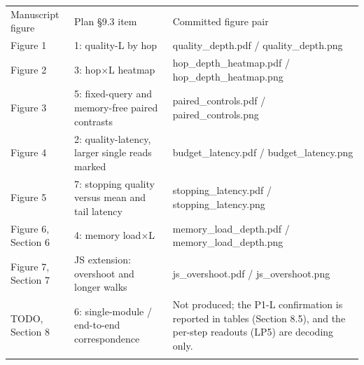 {\small
\setlength{\tabcolsep}{3pt}
\begin{longtable}{W{133}{6}W{350}{6}W{517}{6}}
\toprule
Manuscript figure & Plan \S{}9.3 item & Committed figure pair \\ \addlinespace[3pt]
\midrule \endhead
Figure 1 & 1: quality-L by hop & quality\_depth.pdf /\allowbreak{} quality\_depth.png \\ \addlinespace[3pt]
Figure 2 & 3: hop\ensuremath{\times}L heatmap & hop\_depth\_heatmap.pdf /\allowbreak{} hop\_depth\_heatmap.png \\ \addlinespace[3pt]
Figure 3 & 5: fixed-query and memory-free paired contrasts & paired\_controls.pdf /\allowbreak{} paired\_controls.png \\ \addlinespace[3pt]
Figure 4 & 2: quality-latency, larger single reads marked & budget\_latency.pdf /\allowbreak{} budget\_latency.png \\ \addlinespace[3pt]
Figure 5 & 7: stopping quality versus mean and tail latency & stopping\_latency.pdf /\allowbreak{} stopping\_latency.png \\ \addlinespace[3pt]
Figure 6, Section 6 & 4: memory load\ensuremath{\times}L & memory\_load\_depth.pdf /\allowbreak{} memory\_load\_depth.png \\ \addlinespace[3pt]  %
Figure 7, Section 7 & JS extension: overshoot and longer walks & js\_overshoot.pdf /\allowbreak{} js\_overshoot.png \\ \addlinespace[3pt]  %
TODO, Section 8 & 6: single-module /\allowbreak{} end-to-end correspondence & Not produced; the P1-L confirmation is reported in tables (Section 8.5), and the per-step readouts (LP5) are decoding only. \\ \addlinespace[3pt]
\bottomrule
\end{longtable}
}


